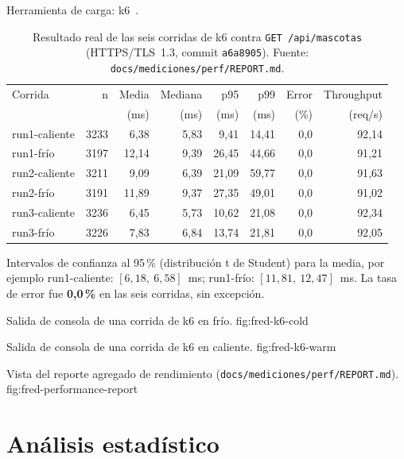 Herramienta de carga: k6~\cite{k6-docs}.

\begin{table}[H]
  \centering
  \small
  \caption{Resultado real de las seis corridas de k6 contra \texttt{GET /api/mascotas} (HTTPS/TLS~1.3, commit \texttt{a6a8905}). Fuente: \texttt{docs/mediciones/perf/REPORT.md}.}
  \label{tab:k6-resultados}
  \begin{tabular}{@{}lrrrrrrr@{}}
    \toprule
    Corrida & n & Media & Mediana & p95 & p99 & Error & Throughput \\
    & & (ms) & (ms) & (ms) & (ms) & (\%) & (req/s) \\
    \midrule
    run1-caliente & 3233 & 6{,}38 & 5{,}83 & 9{,}41 & 14{,}41 & 0{,}0 & 92{,}14 \\
    run1-fr\'io & 3197 & 12{,}14 & 9{,}39 & 26{,}45 & 44{,}66 & 0{,}0 & 91{,}21 \\
    run2-caliente & 3211 & 9{,}09 & 6{,}39 & 21{,}09 & 59{,}77 & 0{,}0 & 91{,}63 \\
    run2-fr\'io & 3191 & 11{,}89 & 9{,}37 & 27{,}35 & 49{,}01 & 0{,}0 & 91{,}02 \\
    run3-caliente & 3236 & 6{,}45 & 5{,}73 & 10{,}62 & 21{,}08 & 0{,}0 & 92{,}34 \\
    run3-fr\'io & 3226 & 7{,}83 & 6{,}84 & 13{,}74 & 21{,}81 & 0{,}0 & 92{,}05 \\
    \bottomrule
  \end{tabular}
\end{table}

Intervalos de confianza al 95\,\% (distribuci\'on t de Student) para la
media, por ejemplo run1-caliente: $[6{,}18,\ 6{,}58]$~ms; run1-fr\'io:
$[11{,}81,\ 12{,}47]$~ms. La tasa de error fue \textbf{0{,}0\,\%} en las
seis corridas, sin excepci\'on.

%
{Salida de consola de una corrida de k6 en fr\'io.}%
{fig:fred-k6-cold}

%
{Salida de consola de una corrida de k6 en caliente.}%
{fig:fred-k6-warm}

%
{Vista del reporte agregado de rendimiento (\texttt{docs/mediciones/perf/REPORT.md}).}%
{fig:fred-performance-report}

\section{An\'alisis estad\'istico}

